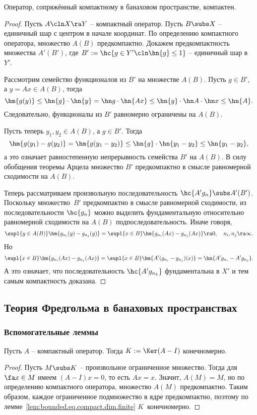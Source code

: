 \documentclass[a4paper]{article}
\begin{document}
\begin{theorem}
Оператор, сопряжённый компактному в банаховом пространстве, компактен.
\end{theorem}
\begin{proof}
Пусть $A\cln X\ra Y$ -- компактный оператор. Пусть $B \subs X$ -- единичный шар с центром в начале координат.
По определению компактного оператора, множество $A(B)$ предкомпактно. Докажем предкомпактность
множества $A'(B')$, где $B' := \hc{g \in Y'\cln \hn{g} \le 1}$ -- единичный шар в $Y'$.

Рассмотрим семейство функционалов из $B'$ на множестве $A(B)$.
Пусть $g \in B'$, а $y = Ax \in A(B)$, тогда
$$\hm{g(y)} \le \hn{g}\cdot \hn{y} = \hn g \cdot \hn{Ax} \le \hn{g} \cdot \hn A \cdot \hn x \le \hn{A}.$$
Следовательно, функционалы из $B'$ равномерно ограничены на $A(B)$.

Пусть теперь $y_1, y_2 \in A(B)$, а $g \in B'$. Тогда
$$\hm{g(y_1) - g(y_2)} = \hm{g(y_1-y_2)} \le \hn{g}\cdot\hn{y_1-y_2} \le \hn{y_1-y_2},$$
а это означает равностепенную непрерывность семейства $B'$ на $A(B)$. В силу обобщения
теоремы Арцела множество $B'$ предкомпактно в смысле равномерной сходимости на $A(B)$.

Теперь рассматриваем произвольную последовательность $\hc{A'g_n} \subs A'(B')$.
Поскольку множество~$B'$ предкомпактно в смысле равномерной сходимости, из последовательности $\hc{g_n}$
можно выделить фундаментальную относительно равномерной сходимости на $A(B)$ подпоследовательность.
Иначе говоря,
$$\supl{y \in A(B)} \hm{g_{n_i}(y) - g_{n_j}(y)} = \supl{x \in B} \hm{g_{n_i}(Ax) - g_{n_j}(Ax)} \ra 0,
\quad n_i, n_j \ra \infty.$$
Но
$$\supl{x \in B} \hm{g_{n_i}(Ax) - g_{n_j}(Ax)}  = \supl{x \in B} \hm{A'(g_{n_i}-g_{n_j})(x)}  =
\hn{A'g_{n_i} - A'g_{n_j}}.$$
А это означает, что последовательность $\hc{A'g_{n_k}}$ фундаментальна в $X'$ и тем самым компактность
доказана.
\end{proof}

\subsection{Теория Фредгольма в банаховых пространствах}

\subsubsection{Вспомогательные леммы}

\begin{lemma}\label{lem:dim.ker.finite}
Пусть $A$ -- компактный оператор. Тогда $K := \Ker(A - I)$ конечномерно.
\end{lemma}
\begin{proof}
Пусть $M \subs K$ -- произвольное ограниченное множество.
Тогда для $\fa x \in M$ имеем $(A-I)x =0$, то есть $Ax = x$.
Значит, $A(M) = M$, но по определению компактного оператора,
множество $A(M)$ предкомпактно. Таким образом, каждое ограниченное подмножество
в ядре предкомпактно, поэтому по лемме~\ref{lem:bounded.eq.compact.dim.finite}
$K$~конечномерно.
\end{proof}
\end{document}
